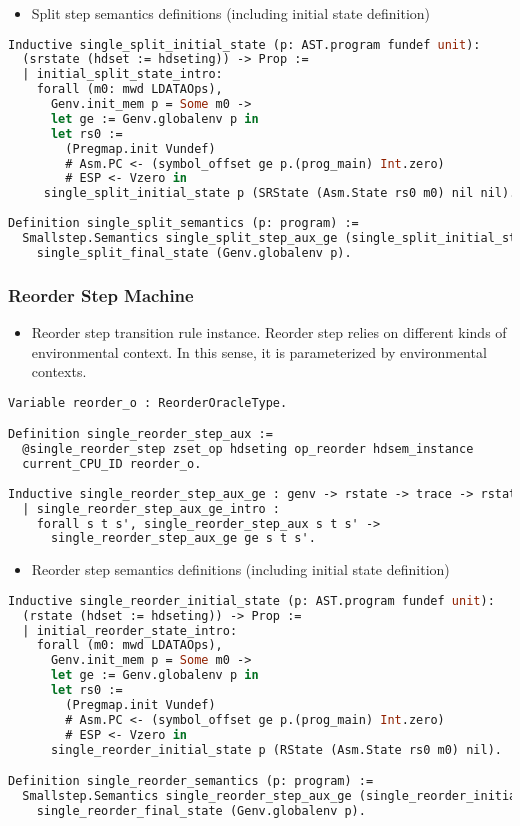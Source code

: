 \begin{itemize}[leftmargin=*]
\item Split step semantics definitions (including initial state definition)
\end{itemize}
\begin{lstlisting}[language=Caml]
Inductive single_split_initial_state (p: AST.program fundef unit): 
  (srstate (hdset := hdseting)) -> Prop :=
  | initial_split_state_intro: 
    forall (m0: mwd LDATAOps),
      Genv.init_mem p = Some m0 ->
      let ge := Genv.globalenv p in
      let rs0 :=
        (Pregmap.init Vundef)
        # Asm.PC <- (symbol_offset ge p.(prog_main) Int.zero)
        # ESP <- Vzero in
     single_split_initial_state p (SRState (Asm.State rs0 m0) nil nil).
          
Definition single_split_semantics (p: program) :=
  Smallstep.Semantics single_split_step_aux_ge (single_split_initial_state p) 
    single_split_final_state (Genv.globalenv p).
\end{lstlisting}

\subsubsection{Reorder Step Machine}
\begin{itemize}[leftmargin=*]
\item Reorder step transition rule instance. Reorder step relies on different kinds of environmental context. In this sense, 
it is parameterized by environmental contexts.
\end{itemize}
\begin{lstlisting}[language=Caml]
Variable reorder_o : ReorderOracleType.

Definition single_reorder_step_aux :=
  @single_reorder_step zset_op hdseting op_reorder hdsem_instance 
  current_CPU_ID reorder_o.
  
Inductive single_reorder_step_aux_ge : genv -> rstate -> trace -> rstate -> Prop :=
  | single_reorder_step_aux_ge_intro : 
    forall s t s', single_reorder_step_aux s t s' -> 
      single_reorder_step_aux_ge ge s t s'.  
\end{lstlisting}


\begin{itemize}[leftmargin=*]
\item Reorder step semantics definitions (including initial state definition)
\end{itemize}
\begin{lstlisting}[language=Caml]
Inductive single_reorder_initial_state (p: AST.program fundef unit): 
  (rstate (hdset := hdseting)) -> Prop :=
  | initial_reorder_state_intro: 
    forall (m0: mwd LDATAOps),
      Genv.init_mem p = Some m0 ->
      let ge := Genv.globalenv p in
      let rs0 :=
        (Pregmap.init Vundef)
        # Asm.PC <- (symbol_offset ge p.(prog_main) Int.zero)
        # ESP <- Vzero in
      single_reorder_initial_state p (RState (Asm.State rs0 m0) nil).

Definition single_reorder_semantics (p: program) :=
  Smallstep.Semantics single_reorder_step_aux_ge (single_reorder_initial_state p) 
    single_reorder_final_state (Genv.globalenv p).
\end{lstlisting}

